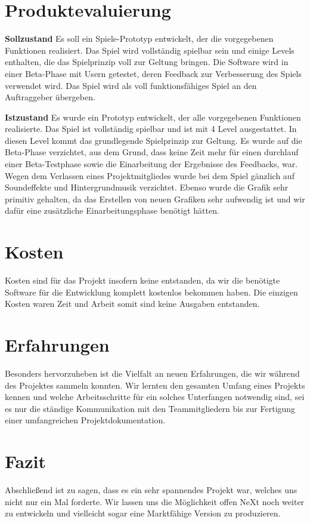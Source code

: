 \section{Produktevaluierung}
\textbf{Sollzustand}\newline
Es soll ein Spiele-Prototyp entwickelt, der die vorgegebenen Funktionen realisiert. Das Spiel wird vollständig spielbar sein und einige Levels enthalten, die das Spielprinzip voll zur Geltung bringen. Die Software wird in einer Beta-Phase mit Usern getestet, deren Feedback zur Verbesserung des Spiels verwendet wird. Das Spiel wird als voll funktionsfähiges Spiel an den Auftraggeber übergeben.

\textbf{Istzustand}\newline
Es wurde ein Prototyp entwickelt, der alle vorgegebenen Funktionen realisierte. Das Spiel ist vollständig spielbar und ist mit 4 Level ausgestattet. In diesen Level kommt das grundlegende Spielprinzip zur Geltung. Es wurde auf die Beta-Phase verzichtet, aus dem Grund, dass keine Zeit mehr für einen durchlauf einer Beta-Testphase sowie die Einarbeitung der Ergebnisse des Feedbacks, war. Wegen dem Verlassen eines Projektmitgliedes wurde bei dem Spiel gänzlich auf Soundeffekte und Hintergrundmusik verzichtet. Ebenso wurde die Grafik sehr primitiv gehalten, da das Erstellen von neuen Grafiken sehr aufwendig ist und wir dafür eine zusätzliche Einarbeitungsphase benötigt hätten.

\section{Kosten}
Kosten sind für das Projekt insofern keine entstanden, da wir die benötigte Software für die Entwicklung komplett kostenlos bekommen haben. Die einzigen Kosten waren Zeit und Arbeit somit sind keine Ausgaben entstanden.

\section{Erfahrungen}
Besonders hervorzuheben ist die Vielfalt an neuen Erfahrungen, die wir während des Projektes sammeln konnten. Wir lernten den gesamten Umfang eines Projekts kennen und welche Arbeitsschritte für ein solches Unterfangen notwendig sind, sei es nur die ständige Kommunikation mit den Teammitgliedern bis zur Fertigung einer umfangreichen Projektdokumentation. 

\section{Fazit}
Abschließend ist zu sagen, dass es ein sehr spannendes Projekt war, welches uns nicht nur ein Mal forderte. Wir lassen uns die Möglichkeit offen NeXt noch weiter zu entwickeln und vielleicht sogar eine Marktfähige Version zu produzieren.

